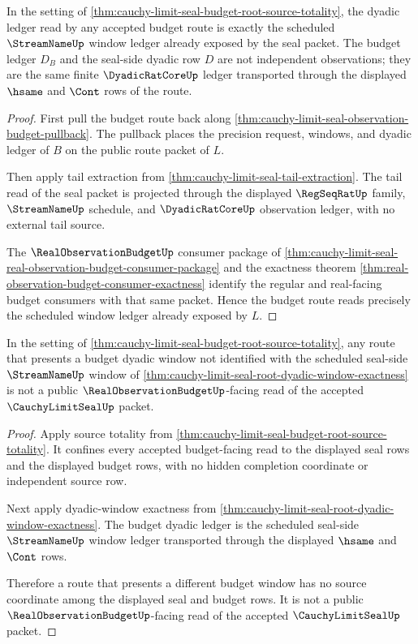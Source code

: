 \begin{theorem}
\label{thm:cauchy-limit-seal-root-dyadic-window-exactness}
In the setting of \autoref{thm:cauchy-limit-seal-budget-root-source-totality}, the dyadic ledger read by any accepted budget route is exactly the scheduled $\StreamNameUp$ window ledger already exposed by the seal packet. The budget ledger $D_B$ and the seal-side dyadic row $D$ are not independent observations; they are the same finite $\DyadicRatCoreUp$ ledger transported through the displayed $\hsame$ and $\Cont$ rows of the route.
\end{theorem}
\begin{proof}
First pull the budget route back along \autoref{thm:cauchy-limit-seal-observation-budget-pullback}. The pullback places the precision request, windows, and dyadic ledger of $B$ on the public route packet of $L$.

Then apply tail extraction from \autoref{thm:cauchy-limit-seal-tail-extraction}. The tail read of the seal packet is projected through the displayed $\RegSeqRatUp$ family, $\StreamNameUp$ schedule, and $\DyadicRatCoreUp$ observation ledger, with no external tail source.

The $\RealObservationBudgetUp$ consumer package of \autoref{thm:cauchy-limit-seal-real-observation-budget-consumer-package} and the exactness theorem \autoref{thm:real-observation-budget-consumer-exactness} identify the regular and real-facing budget consumers with that same packet. Hence the budget route reads precisely the scheduled window ledger already exposed by $L$.
\end{proof}

\begin{theorem}
\label{thm:cauchy-limit-seal-budget-window-source-refusal}
In the setting of \autoref{thm:cauchy-limit-seal-budget-root-source-totality}, any route that presents a budget dyadic window not identified with the scheduled seal-side $\StreamNameUp$ window of \autoref{thm:cauchy-limit-seal-root-dyadic-window-exactness} is not a public $\RealObservationBudgetUp$-facing read of the accepted $\CauchyLimitSealUp$ packet.
\end{theorem}
\begin{proof}
Apply source totality from \autoref{thm:cauchy-limit-seal-budget-root-source-totality}. It confines every accepted budget-facing read to the displayed seal rows and the displayed budget rows, with no hidden completion coordinate or independent source row.

Next apply dyadic-window exactness from \autoref{thm:cauchy-limit-seal-root-dyadic-window-exactness}. The budget dyadic ledger is the scheduled seal-side $\StreamNameUp$ window ledger transported through the displayed $\hsame$ and $\Cont$ rows.

Therefore a route that presents a different budget window has no source coordinate among the displayed seal and budget rows. It is not a public $\RealObservationBudgetUp$-facing read of the accepted $\CauchyLimitSealUp$ packet.
\end{proof}


